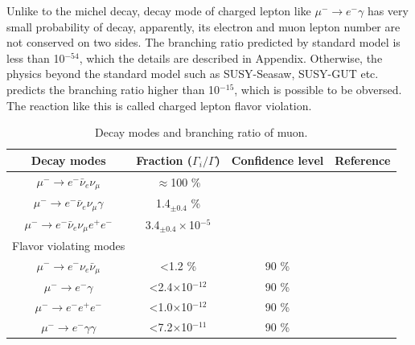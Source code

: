 Unlike to the michel decay, decay mode of charged lepton like $\mu^- \rightarrow e^- \gamma$ has very small probability of decay, apparently, its electron and muon lepton number are not conserved on two sides.
The branching ratio predicted by standard model is less than 10$^{-54}$, which the details are described in Appendix.
Otherwise, the physics beyond the standard model such as SUSY-Seasaw, SUSY-GUT etc. predicts the branching ratio higher than 10$^{-15}$, which is possible to be obversed.
The reaction like this is called charged lepton flavor violation.
\begin{table}[H]
 \centering
 \begin{tabular}{cccc} \hline \hline
  Decay modes & Fraction ($\Gamma_i/\Gamma$) & Confidence level & Reference \\ \hline
  $\mu^- \rightarrow e^- \bar\nu_e \nu_\mu$ & $\approx$100 \% & & \\
  $\mu^- \rightarrow e^- \bar\nu_e \nu_\mu \gamma$ & 1.4$_{\pm 0.4}$ \% &  & \cite{critt} \\
  $\mu^- \rightarrow e^- \bar\nu_e \nu_\mu e^+ e^-$ & 3.4$_{\pm 0.4}\times$10$^{-5}$ & &  \\ \hline
  Flavor violating modes & & & \\ \hline
  $\mu^- \rightarrow e^- \nu_e \bar\nu_\mu$ & \textless 1.2 \% & 90 \% & \cite{free} \\
  $\mu^- \rightarrow e^- \gamma$ & \textless 2.4$\times$10$^{-12}$ & 90 \% & \cite{bolton} \\
  $\mu^- \rightarrow e^- e^+ e^-$ & \textless 1.0$\times$10$^{-12}$ & 90 \% & \cite{bertl} \\
  $\mu^- \rightarrow e^- \gamma \gamma$ & \textless 7.2$\times$10$^{-11}$ & 90 \% & \\ \hline \hline
 \end{tabular}
 \caption{Decay modes and branching ratio of muon.}
 \label{mudecay}
\end{table}


